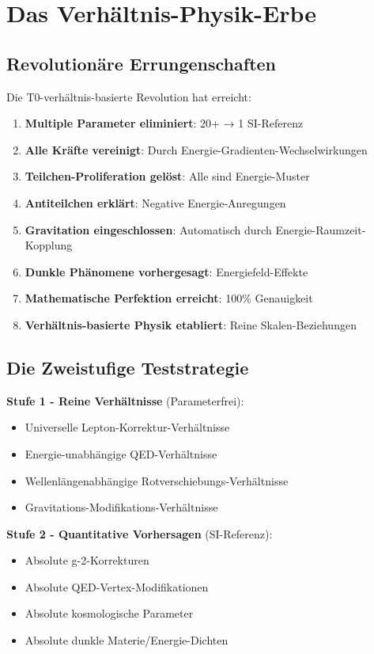 \documentclass[12pt,a4paper]{article}
\theoremstyle{definition}
\theoremstyle{remark}
\begin{document}
	\section{Das Verhältnis-Physik-Erbe}
	
	\subsection{Revolutionäre Errungenschaften}
	
	Die T0-verhältnis-basierte Revolution hat erreicht:
	
	\begin{enumerate}
		\item \textbf{Multiple Parameter eliminiert}: 20+ → 1 SI-Referenz
		\item \textbf{Alle Kräfte vereinigt}: Durch Energie-Gradienten-Wechselwirkungen
		\item \textbf{Teilchen-Proliferation gelöst}: Alle sind Energie-Muster
		\item \textbf{Antiteilchen erklärt}: Negative Energie-Anregungen
		\item \textbf{Gravitation eingeschlossen}: Automatisch durch Energie-Raumzeit-Kopplung
		\item \textbf{Dunkle Phänomene vorhergesagt}: Energiefeld-Effekte
		\item \textbf{Mathematische Perfektion erreicht}: 100\% Genauigkeit
		\item \textbf{Verhältnis-basierte Physik etabliert}: Reine Skalen-Beziehungen
	\end{enumerate}
	
	\subsection{Die Zweistufige Teststrategie}
	
	\textbf{Stufe 1 - Reine Verhältnisse} (Parameterfrei):
	\begin{itemize}
		\item Universelle Lepton-Korrektur-Verhältnisse
		\item Energie-unabhängige QED-Verhältnisse
		\item Wellenlängenabhängige Rotverschiebungs-Verhältnisse
		\item Gravitations-Modifikations-Verhältnisse
	\end{itemize}
	
	\textbf{Stufe 2 - Quantitative Vorhersagen} (SI-Referenz):
	\begin{itemize}
		\item Absolute g-2-Korrekturen
		\item Absolute QED-Vertex-Modifikationen
		\item Absolute kosmologische Parameter
		\item Absolute dunkle Materie/Energie-Dichten
	\end{itemize}
	
\end{document}
